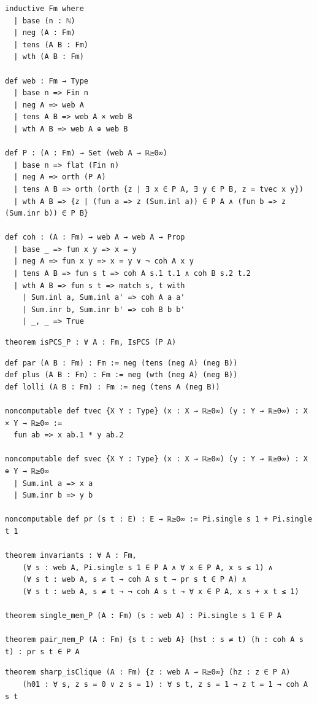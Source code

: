 \begin{lstlisting}
inductive Fm where
  | base (n : ℕ)
  | neg (A : Fm)
  | tens (A B : Fm)
  | wth (A B : Fm)

def web : Fm → Type
  | base n => Fin n
  | neg A => web A
  | tens A B => web A × web B
  | wth A B => web A ⊕ web B

def P : (A : Fm) → Set (web A → ℝ≥0∞)
  | base n => flat (Fin n)
  | neg A => orth (P A)
  | tens A B => orth (orth {z | ∃ x ∈ P A, ∃ y ∈ P B, z = tvec x y})
  | wth A B => {z | (fun a => z (Sum.inl a)) ∈ P A ∧ (fun b => z (Sum.inr b)) ∈ P B}

def coh : (A : Fm) → web A → web A → Prop
  | base _ => fun x y => x = y
  | neg A => fun x y => x = y ∨ ¬ coh A x y
  | tens A B => fun s t => coh A s.1 t.1 ∧ coh B s.2 t.2
  | wth A B => fun s t => match s, t with
    | Sum.inl a, Sum.inl a' => coh A a a'
    | Sum.inr b, Sum.inr b' => coh B b b'
    | _, _ => True
\end{lstlisting}

\begin{lstlisting}
theorem isPCS_P : ∀ A : Fm, IsPCS (P A)
\end{lstlisting}

\begin{lstlisting}
def par (A B : Fm) : Fm := neg (tens (neg A) (neg B))
def plus (A B : Fm) : Fm := neg (wth (neg A) (neg B))
def lolli (A B : Fm) : Fm := neg (tens A (neg B))

noncomputable def tvec {X Y : Type} (x : X → ℝ≥0∞) (y : Y → ℝ≥0∞) : X × Y → ℝ≥0∞ :=
  fun ab => x ab.1 * y ab.2

noncomputable def svec {X Y : Type} (x : X → ℝ≥0∞) (y : Y → ℝ≥0∞) : X ⊕ Y → ℝ≥0∞
  | Sum.inl a => x a
  | Sum.inr b => y b

noncomputable def pr (s t : E) : E → ℝ≥0∞ := Pi.single s 1 + Pi.single t 1

theorem invariants : ∀ A : Fm,
    (∀ s : web A, Pi.single s 1 ∈ P A ∧ ∀ x ∈ P A, x s ≤ 1) ∧
    (∀ s t : web A, s ≠ t → coh A s t → pr s t ∈ P A) ∧
    (∀ s t : web A, s ≠ t → ¬ coh A s t → ∀ x ∈ P A, x s + x t ≤ 1)

theorem single_mem_P (A : Fm) (s : web A) : Pi.single s 1 ∈ P A

theorem pair_mem_P (A : Fm) {s t : web A} (hst : s ≠ t) (h : coh A s t) : pr s t ∈ P A
\end{lstlisting}

\begin{lstlisting}
theorem sharp_isClique (A : Fm) {z : web A → ℝ≥0∞} (hz : z ∈ P A)
    (h01 : ∀ s, z s = 0 ∨ z s = 1) : ∀ s t, z s = 1 → z t = 1 → coh A s t
\end{lstlisting}

